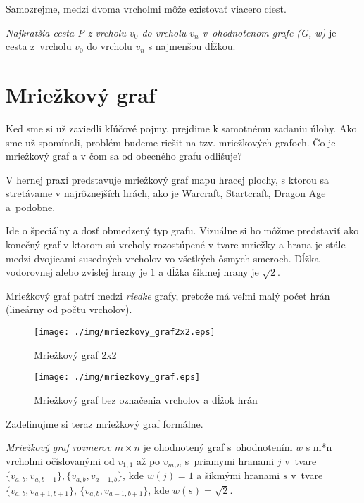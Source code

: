 Samozrejme, medzi dvoma vrcholmi môže existovať viacero ciest.

\begin{define}
{\sl Najkratšia cesta P z vrcholu $v_0$ do vrcholu $v_n$
v~ohodnotenom grafe (G, w)} 
je cesta z~vrcholu $v_0$ do vrcholu $v_n$ s najmenšou dĺžkou. 
\end{define}


\section{Mriežkový graf}

Keď sme si už zaviedli kľúčové pojmy, prejdime k samotnému
zadaniu úlohy.
Ako sme už spomínali, problém budeme riešit na tzv. mriežkových grafoch. Čo je mriežkový graf a v čom sa od obecného grafu odlišuje?

V hernej praxi predstavuje mriežkový graf mapu hracej plochy, s ktorou sa stretávame v najrôznejších hrách, ako je Warcraft, Startcraft, Dragon Age \cite{sturtevant2012benchmarks}
a~podobne.

Ide o špeciálny a dosť obmedzený typ grafu. Vizuálne si ho môžme predstaviť ako konečný graf v ktorom sú vrcholy rozostúpené v tvare mriežky a hrana
je stále medzi dvojicami susedných vrcholov vo všetkých ôsmych smeroch. Dĺžka vodorovnej alebo zvislej hrany je $1$ a dĺžka šikmej hrany je $\sqrt{2}$.

\begin{note}
Mriežkový graf patrí medzi {\sl riedke} grafy,
pretože má veľmi malý počet hrán (lineárny od počtu vrcholov).
\end{note}


\begin{figure}[h]
\centering
\texttt{[image: ./img/mriezkovy\_graf2x2.eps]}
\caption{Mriežkový graf 2x2}
\label{fig:mriezkovy_graf2x2}
\end{figure}


\begin{figure}[h]
\centering
\texttt{[image: ./img/mriezkovy\_graf.eps]}
\caption{Mriežkový graf bez označenia vrcholov a dĺžok hrán}
\label{fig:mriezkovy_graf}
\end{figure}


Zadefinujme si teraz mriežkový graf formálne.

\begin{define}
{\sl Mriežkový graf rozmerov $m \times n$} je ohodnotený graf s~ohodnotením $w$ s m*n vrcholmi očíslovanými od $v_{1,1}$ až po $v_{m,n}$ 
s~priamymi hranami $j$ v~tvare $\{v_{a,b}, v_{a,b+1}\}, \{v_{a,b}, v_{a+1,b}\}$, kde $w(j) = 1$ 
a šikmými hranami $ s $ v~tvare 
$\{v_{a,b}, v_{a+1,b+1}\}$, $\{v_{a,b}, v_{a-1,b+1}\}$, kde $ w(s) = \sqrt{2}$.
\end{define}

